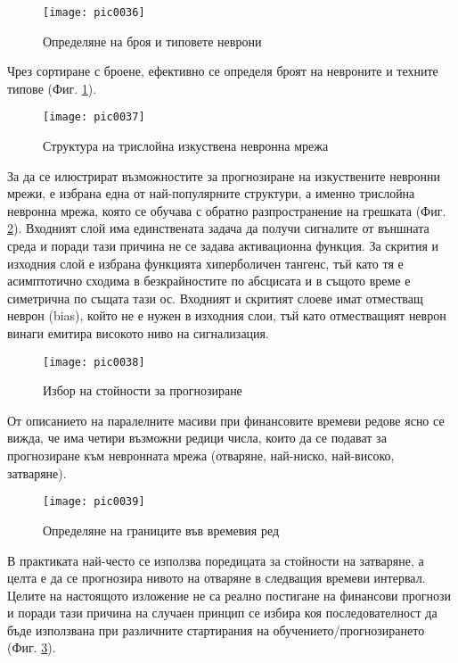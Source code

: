 \begin{figure}[h]
  \centering
  \texttt{[image: pic0036]}
  \caption{Определяне на броя и типовете неврони}
\label{fig:pic0036}
\end{figure}
\FloatBarrier

Чрез сортиране с броене, ефективно се определя броят на невроните и техните типове (Фиг. \ref{fig:pic0036}).

\begin{figure}[h]
  \centering
  \texttt{[image: pic0037]}
  \caption{Структура на трислойна изкуствена невронна мрежа}
\label{fig:pic0037}
\end{figure}
\FloatBarrier

За да се илюстрират възможностите за прогнозиране на изкуствените невронни мрежи, е избрана една от най-популярните структури, а именно трислойна невронна мрежа, която се обучава с обратно разпространение на грешката (Фиг. \ref{fig:pic0037}). Входният слой има единствената задача да получи сигналите от външната среда и поради тази причина не се задава активационна функция. За скрития и изходния слой е избрана функцията хиперболичен тангенс, тъй като тя е асимптотично сходима в безкрайностите по абсцисата и в същото време е симетрична по същата тази ос. Входният и скритият слоеве имат отместващ неврон (bias), който не е нужен в изходния слои, тъй като отместващият неврон винаги емитира високото ниво на сигнализация.

\begin{figure}[h]
  \centering
  \texttt{[image: pic0038]}
  \caption{Избор на стойности за прогнозиране}
\label{fig:pic0038}
\end{figure}
\FloatBarrier

От описанието на паралелните масиви при финансовите времеви редове ясно се вижда, че има четири възможни редици числа, които да се подават за прогнозиране към невронната мрежа (отваряне, най-ниско, най-високо, затваряне). 

\begin{figure}[h]
  \centering
  \texttt{[image: pic0039]}
  \caption{Определяне на границите във времевия ред}
\label{fig:pic0039}
\end{figure}
\FloatBarrier

В практиката най-често се използва поредицата за стойности на затваряне, а целта е да се прогнозира нивото на отваряне в следващия времеви интервал. Целите на настоящото изложение не са реално постигане на финансови прогнози и поради тази причина на случаен принцип се избира коя последователност да бъде използвана при различните стартирания на обучението/прогнозирането (Фиг. \ref{fig:pic0038}).

